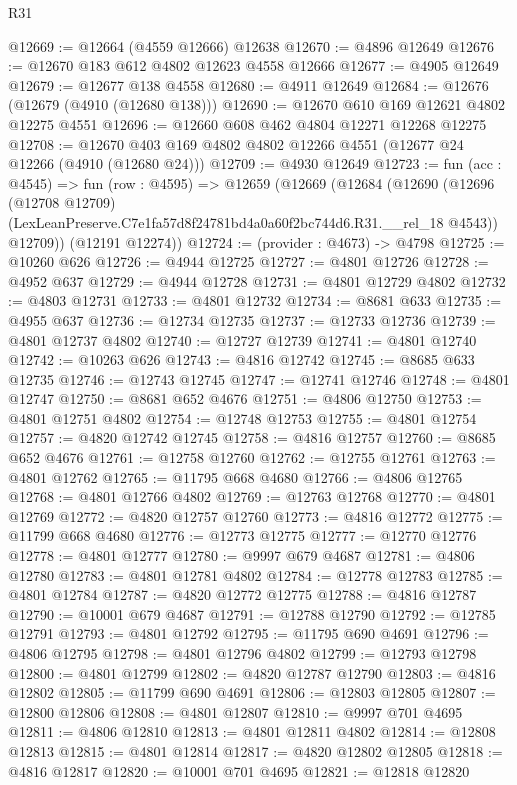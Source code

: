 \begin{lexlean}{R31}
\begin{coremodule}
@12669 := @12664 (@4559 @12666) @12638
@12670 := @4896 @12649
@12676 := @12670 @183 @612 @4802 @12623 @4558 @12666
@12677 := @4905 @12649
@12679 := @12677 @138 @4558
@12680 := @4911 @12649
@12684 := @12676 (@12679 (@4910 (@12680 @138)))
@12690 := @12670 @610 @169 @12621 @4802 @12275 @4551
@12696 := @12660 @608 @462 @4804 @12271 @12268 @12275
@12708 := @12670 @403 @169 @4802 @4802 @12266 @4551 (@12677 @24 @12266 (@4910 (@12680 @24)))
@12709 := @4930 @12649
@12723 := fun (acc : @4545) =>
  fun (row : @4595) =>
  @12659
    (@12669
      (@12684
        (@12690
          (@12696
            (@12708 @12709)
            (LexLeanPreserve.C7e1fa57d8f24781bd4a0a60f2bc744d6.R31.__rel_18 @4543))
          @12709))
      (@12191 @12274))
@12724 := (provider : @4673) -> @4798
@12725 := @10260 @626
@12726 := @4944 @12725
@12727 := @4801 @12726
@12728 := @4952 @637
@12729 := @4944 @12728
@12731 := @4801 @12729 @4802
@12732 := @4803 @12731
@12733 := @4801 @12732
@12734 := @8681 @633
@12735 := @4955 @637
@12736 := @12734 @12735
@12737 := @12733 @12736
@12739 := @4801 @12737 @4802
@12740 := @12727 @12739
@12741 := @4801 @12740
@12742 := @10263 @626
@12743 := @4816 @12742
@12745 := @8685 @633 @12735
@12746 := @12743 @12745
@12747 := @12741 @12746
@12748 := @4801 @12747
@12750 := @8681 @652 @4676
@12751 := @4806 @12750
@12753 := @4801 @12751 @4802
@12754 := @12748 @12753
@12755 := @4801 @12754
@12757 := @4820 @12742 @12745
@12758 := @4816 @12757
@12760 := @8685 @652 @4676
@12761 := @12758 @12760
@12762 := @12755 @12761
@12763 := @4801 @12762
@12765 := @11795 @668 @4680
@12766 := @4806 @12765
@12768 := @4801 @12766 @4802
@12769 := @12763 @12768
@12770 := @4801 @12769
@12772 := @4820 @12757 @12760
@12773 := @4816 @12772
@12775 := @11799 @668 @4680
@12776 := @12773 @12775
@12777 := @12770 @12776
@12778 := @4801 @12777
@12780 := @9997 @679 @4687
@12781 := @4806 @12780
@12783 := @4801 @12781 @4802
@12784 := @12778 @12783
@12785 := @4801 @12784
@12787 := @4820 @12772 @12775
@12788 := @4816 @12787
@12790 := @10001 @679 @4687
@12791 := @12788 @12790
@12792 := @12785 @12791
@12793 := @4801 @12792
@12795 := @11795 @690 @4691
@12796 := @4806 @12795
@12798 := @4801 @12796 @4802
@12799 := @12793 @12798
@12800 := @4801 @12799
@12802 := @4820 @12787 @12790
@12803 := @4816 @12802
@12805 := @11799 @690 @4691
@12806 := @12803 @12805
@12807 := @12800 @12806
@12808 := @4801 @12807
@12810 := @9997 @701 @4695
@12811 := @4806 @12810
@12813 := @4801 @12811 @4802
@12814 := @12808 @12813
@12815 := @4801 @12814
@12817 := @4820 @12802 @12805
@12818 := @4816 @12817
@12820 := @10001 @701 @4695
@12821 := @12818 @12820

\end{coremodule}
\end{lexlean}
